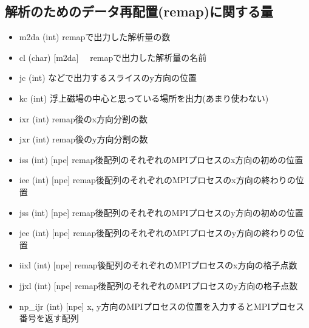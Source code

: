 \documentclass[letterpaper,10pt,dvipdfmx,report]{sphinxmanual}
\begin{document}
\subsection{解析のためのデータ再配置(remap)に関する量}
\label{\detokenize{notation:remap}}\begin{itemize}
\item {} 
m2da (int) \sphinxhyphen{}\sphinxhyphen{} remapで出力した解析量の数

\item {} 
cl (char) {[}m2da{]} \sphinxhyphen{}\sphinxhyphen{}　remapで出力した解析量の名前

\item {} 
jc (int) \sphinxhyphen{}\sphinxhyphen{}  などで出力するスライスのy方向の位置

\item {} 
kc (int) \sphinxhyphen{}\sphinxhyphen{} 浮上磁場の中心と思っている場所を出力(あまり使わない)

\item {} 
ixr (int) \sphinxhyphen{}\sphinxhyphen{} remap後のx方向分割の数

\item {} 
jxr (int) \sphinxhyphen{}\sphinxhyphen{} remap後のy方向分割の数

\item {} 
iss (int) {[}npe{]} \sphinxhyphen{}\sphinxhyphen{} remap後配列のそれぞれのMPIプロセスのx方向の初めの位置

\item {} 
iee (int) {[}npe{]} \sphinxhyphen{}\sphinxhyphen{} remap後配列のそれぞれのMPIプロセスのx方向の終わりの位置

\item {} 
jss (int) {[}npe{]} \sphinxhyphen{}\sphinxhyphen{} remap後配列のそれぞれのMPIプロセスのy方向の初めの位置

\item {} 
jee (int) {[}npe{]} \sphinxhyphen{}\sphinxhyphen{} remap後配列のそれぞれのMPIプロセスのy方向の終わりの位置

\item {} 
iixl (int) {[}npe{]} \sphinxhyphen{}\sphinxhyphen{} remap後配列のそれぞれのMPIプロセスのx方向の格子点数

\item {} 
jjxl (int) {[}npe{]} \sphinxhyphen{}\sphinxhyphen{} remap後配列のそれぞれのMPIプロセスのy方向の格子点数

\item {} 
np\_ijr (int) {[}npe{]} \sphinxhyphen{}\sphinxhyphen{} x, y方向のMPIプロセスの位置を入力するとMPIプロセス番号を返す配列


\end{itemize}
\end{document}
